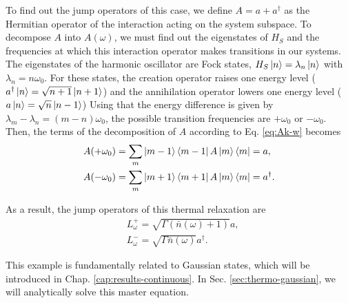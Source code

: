 To find out the jump operators of this case, we define ${A} = {a} + {a}^\dagger$ as the Hermitian operator of the interaction acting on the system subspace. To decompose ${A}$ into ${A}(\omega)$, we must find out the eigenstates of ${H}_S$ and the frequencies at which this interaction operator makes transitions in our systems. The eigenstates of the harmonic oscillator are Fock states, ${H}_S \ket{n} = \lambda_n \ket{n}$ with $\lambda_n = n \omega_0$. For these states, the creation operator raises one energy level (${a}^\dagger \ket{n} = \sqrt{n+1} \ket{n+1}$) and the annihilation operator lowers one energy level (${a} \ket{n} = \sqrt{n} \ket{n-1}$) Using that the energy difference is given by $\lambda_m - \lambda_n = (m - n) \omega_0$, the possible transition frequencies are $+\omega_0$ or $-\omega_0$. Then, the terms of the decomposition of ${A}$ according to Eq. \eqref{eq:Ak-w} becomes
\begin{align}
    &{A}(+\omega_0) = \sum_{m} \ket{m-1}\bra{m-1} {A} \ket{m}\bra{m} = {a},\\
    &{A}(-\omega_0) = \sum_{m} \ket{m+1}\bra{m+1} {A} \ket{m}\bra{m} = {a}^\dagger.
\end{align}

\noindent As a result, the jump operators of this thermal relaxation are
\begin{align}
    &L_\omega^{+} = \sqrt{\Gamma (\bar{n}(\omega)+1)} {a},\\
    &L_\omega^{-} = \sqrt{\Gamma \bar{n}(\omega)} {a}^\dagger.
    \label{eq:jump-oscillator}
\end{align}

\noindent This example is fundamentally related to Gaussian states, which will be introduced in Chap. \ref{cap:results-continuous}. In Sec. \ref{sec:thermo-gaussian}, we will analytically solve this master equation.


